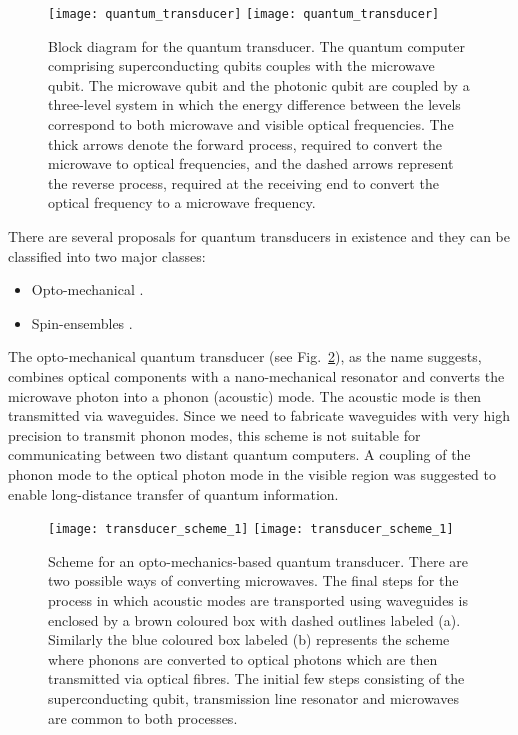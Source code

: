 \begin{figure}[!htbp]
\pubmode
\texttt{[image: quantum\_transducer]}
\else
\texttt{[image: quantum\_transducer]}
\fi
\captionspacefig \caption{Block diagram for the quantum transducer. The quantum computer comprising superconducting qubits couples with the microwave qubit. The microwave qubit and the photonic qubit are coupled by a three-level system in which the energy difference between the levels correspond to both microwave and visible optical frequencies. The thick arrows denote the forward process, required to convert the microwave to optical frequencies, and the dashed arrows represent the reverse process, required at the receiving end to convert the optical frequency to a microwave frequency.}\label{fig:quantum_transducer}
\end{figure}

There are several proposals for quantum transducers in existence and they can be classified into two major classes:
\begin{itemize}
	\item Opto-mechanical \cite{bib:rabl2010quantum, bib:barzanjeh2011entangling, bib:bochmann2013nanomechanical, bib:didier2014quantum, bib:schuetz2015universal, bib:shumeiko2016quantum, bib:stannigel2010optomechanical}.
	\item Spin-ensembles \cite{bib:imamouglu2009cavity, bib:blum2015interfacing}.
\end{itemize}

The opto-mechanical quantum transducer (see Fig.~\ref{fig:opto_mechanics_transducer}), as the name suggests, combines optical components with a nano-mechanical resonator and converts the microwave photon into a phonon (acoustic) mode. The acoustic mode is then transmitted via waveguides. Since we need to fabricate waveguides with very high precision to transmit phonon modes, this scheme is not suitable for communicating between two distant quantum computers. A coupling of the phonon mode to the optical photon mode in the visible region was suggested to enable long-distance transfer of quantum information.

\begin{figure}[!htbp]
\pubmode
\texttt{[image: transducer\_scheme\_1]}
\else
\texttt{[image: transducer\_scheme\_1]}
\fi
\captionspacefig \caption{Scheme for an opto-mechanics-based quantum transducer. There are two possible ways of converting microwaves. The final steps for the process in which acoustic modes are transported using waveguides is enclosed by a brown coloured box with dashed outlines labeled (a). Similarly the blue coloured box labeled (b) represents the scheme where phonons are converted to optical photons which are then transmitted via optical fibres. The initial few steps consisting of the superconducting qubit, transmission line resonator and microwaves are common to both processes.}\label{fig:opto_mechanics_transducer}
\end{figure}

